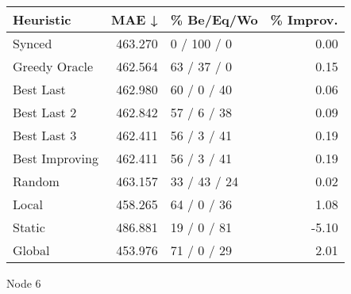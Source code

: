 \begin{tabular}{lrlr}
\toprule
\textbf{Heuristic} & \textbf{MAE ↓} & \textbf{\% Be/Eq/Wo} & \textbf{\% Improv.} \\
\midrule
            Synced &        463.270 &          0 / 100 / 0 &                0.00 \\
     Greedy Oracle &        462.564 &          63 / 37 / 0 &                0.15 \\
         Best Last &        462.980 &          60 / 0 / 40 &                0.06 \\
       Best Last 2 &        462.842 &          57 / 6 / 38 &                0.09 \\
       Best Last 3 &        462.411 &          56 / 3 / 41 &                0.19 \\
    Best Improving &        462.411 &          56 / 3 / 41 &                0.19 \\
            Random &        463.157 &         33 / 43 / 24 &                0.02 \\
             Local &        458.265 &          64 / 0 / 36 &                1.08 \\
            Static &        486.881 &          19 / 0 / 81 &               -5.10 \\
            Global &        453.976 &          71 / 0 / 29 &                2.01 \\
\bottomrule
\end{tabular}
\caption{Node 6}
\label{tab:non_lr01_le1_bs4_6}
